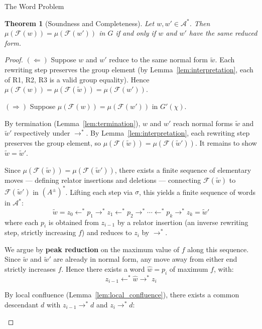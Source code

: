 \documentclass{article}
\newtheorem{theorem}{Theorem}[section]
\theoremstyle{definition}
\theoremstyle{remark}
\theoremstyle{theorem}
\theoremstyle{definition}
\begin{document}
\begin{section}{The Word Problem}
\begin{theorem}[Soundness and Completeness]\label{thm:word_problem}
    Let $w,w'\in \mathcal{A}^*$. Then $\mu(\mathcal{F}(w))=\mu(\mathcal{F}(w'))$ in $G$ if and only if $w$ and $w'$ have the same reduced form.
\end{theorem}

\begin{proof}
$(\Leftarrow)$ Suppose $w$ and $w'$ reduce to the same normal form $\tilde{w}$. Each rewriting step preserves the group element (by Lemma~\ref{lem:interpretation}, each of R1, R2, R3 is a valid group equality). Hence $\mu(\mathcal{F}(w)) = \mu(\mathcal{F}(\tilde{w})) = \mu(\mathcal{F}(w'))$.

$(\Rightarrow)$ Suppose $\mu(\mathcal{F}(w))=\mu(\mathcal{F}(w'))$ in $G'(\chi)$.

By termination (Lemma~\ref{lem:termination}), $w$ and $w'$
reach normal forms $\tilde{w}$ and $\tilde{w}'$ respectively under $\to^*$.
By Lemma~\ref{lem:interpretation}, each rewriting step preserves the group
element, so $\mu(\mathcal{F}(\tilde{w}))=\mu(\mathcal{F}(\tilde{w}'))$.
It remains to show $\tilde{w}=\tilde{w}'$.

Since $\mu(\mathcal{F}(\tilde{w}))=\mu(\mathcal{F}(\tilde{w}'))$, there
exists a finite sequence of elementary moves --- defining relator insertions
and deletions --- connecting $\mathcal{F}(\tilde{w})$ to
$\mathcal{F}(\tilde{w}')$ in $(A^\pm)^*$. Lifting each step via $\sigma$,
this yields a finite sequence of words in $\mathcal{A}^*$:
\[
\tilde{w}=z_0\leftarrow^* p_1\to^* z_1\leftarrow^* p_2\to^*\cdots
\leftarrow^* p_k\to^* z_k=\tilde{w}'
\]
where each $p_i$ is obtained from $z_{i-1}$ by a relator insertion (an
inverse rewriting step, strictly increasing $f$) and reduces to $z_i$
by $\to^*$.

We argue by \textbf{peak reduction} on the maximum value of $f$ along
this sequence. Since $\tilde{w}$ and $\tilde{w}'$ are already in normal
form, any move away from either end strictly increases $f$. Hence there
exists a word $\hat{w}=p_i$ of maximum $f$, with:
\[
z_{i-1}\leftarrow^*\hat{w}\to^* z_i
\]

By local confluence (Lemma~\ref{lem:local_confluence}), there exists a
common descendant $d$ with $z_{i-1}\to^* d$ and $z_i\to^* d$:

\begin{center}
\end{center}


\end{proof}
\end{section}
\end{document}
